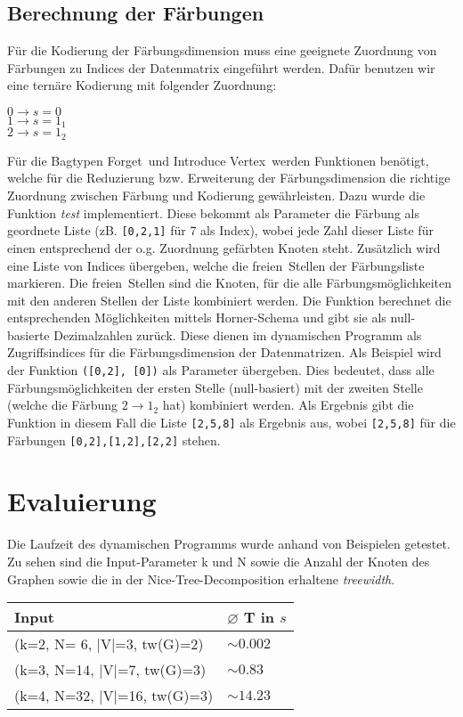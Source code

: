 \subsection{Berechnung der Färbungen}
\label{ssec:colors}
Für die Kodierung der Färbungsdimension muss eine geeignete Zuordnung von Färbungen zu Indices der Datenmatrix eingeführt werden. Dafür benutzen wir eine ternäre Kodierung mit folgender Zuordnung:
\begin{center}
$0 \rightarrow s=0$\\
$1 \rightarrow s=1_1$\\
$2 \rightarrow s=1_2$\\
\end{center}
Für die Bagtypen \glqq Forget\grqq ~und \glqq Introduce Vertex\grqq ~werden Funktionen benötigt, welche für die Reduzierung bzw. Erweiterung der Färbungsdimension die richtige Zuordnung zwischen Färbung und Kodierung gewährleisten.
Dazu wurde die Funktion \textit{test} implementiert. 
Diese bekommt als Parameter die Färbung als geordnete Liste (zB. \texttt{[0,2,1]} für 7 als Index), wobei jede Zahl dieser Liste für einen entsprechend der o.g. Zuordnung gefärbten Knoten steht. 
Zusätzlich wird eine Liste von Indices übergeben, welche die \glqq freien\grqq ~Stellen der Färbungsliste markieren. 
Die \glqq freien\grqq ~Stellen sind die Knoten, für die alle Färbungsmöglichkeiten mit den anderen Stellen der Liste kombiniert werden. 
Die Funktion berechnet die entsprechenden Möglichkeiten mittels Horner-Schema und gibt sie als null-basierte Dezimalzahlen zurück. 
Diese dienen im dynamischen Programm als Zugriffsindices für die Färbungsdimension der Datenmatrizen. 
Als Beispiel wird der Funktion \texttt{([0,2], [0])} als Parameter übergeben. 
Dies bedeutet, dass alle Färbungsmöglichkeiten der ersten Stelle (null-basiert) mit der zweiten Stelle (welche die Färbung $2 \rightarrow 1_2$ hat) kombiniert werden. 
Als Ergebnis gibt die Funktion in diesem Fall die Liste \texttt{[2,5,8]} als Ergebnis aus, wobei \texttt{[2,5,8]} für die Färbungen \texttt{[0,2],[1,2],[2,2]} stehen.

\section{Evaluierung}
\label{sec:eval}
Die Laufzeit des dynamischen Programms wurde anhand von Beispielen getestet. Zu sehen sind die Input-Parameter k und N sowie die Anzahl der Knoten des Graphen sowie die in der Nice-Tree-Decomposition erhaltene \textit{treewidth}.
\begin{table}
\centering
\begin{tabular}{l | l} 
\textbf{Input} & \textbf{ $\varnothing$ T in $s$}\\
\hline
(k=2, N= 6, |V|=3, tw(G)=2) & $ \sim 0.002$ \\
(k=3, N=14, |V|=7, tw(G)=3) & $ \sim 0.83$ \\
(k=4, N=32, |V|=16, tw(G)=3) & $ \sim 14.23$ \\
\end{tabular}
\end{table}

